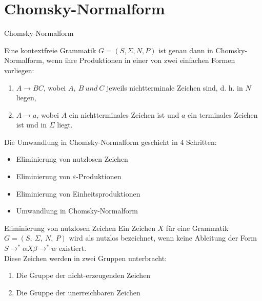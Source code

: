 \documentclass{beamer}
\begin{document}
	\section{Chomsky-Normalform}
		\begin{frame}{Chomsky-Normalform}
			\begin{definition}
				Eine kontextfreie Grammatik $G = (S, \Sigma, N, P)$ ist genau dann in Chomsky-Normalform, wenn ihre Produktionen in einer von zwei einfachen Formen vorliegen:
				\begin{enumerate}
					\item $A \to BC$, wobei $A,\ B \ und \ C$ jeweils nichtterminale Zeichen sind, d. h. in $N$ liegen,
					\item $A \to a$, wobei $A$ ein nichtterminales Zeichen ist und $a$ ein terminales Zeichen ist und in $\Sigma$ liegt. 
				\end{enumerate}
			\end{definition}
			\pause
			Die Umwandlung in Chomsky-Normalform geschieht in 4 Schritten:
			\pause
			\begin{itemize}
				\item Eliminierung von nutzlosen Zeichen
				\pause
				\item Eliminierung von $\varepsilon$-Produktionen
				\pause
				\item Eliminierung von Einheitsproduktionen
				\pause
				\item Umwandlung in Chomsky-Normalform
			\end{itemize}
		\end{frame}
		\begin{frame}{Eliminierung von nutzlosen Zeichen}
			Ein Zeichen $X$ für eine Grammatik $G = (S, \ \Sigma, \ N, \ P)$ wird als nutzlos bezeichnet, wenn keine Ableitung der Form $S \to^{*} \alpha X \beta \to^{*} w$ existiert.\\
			\pause
			Diese Zeichen werden in zwei Gruppen unterbracht:\\
			\pause
			\begin{enumerate}
				\item Die Gruppe der nicht-erzeugenden Zeichen
				\pause
				\item Die Gruppe der unerreichbaren Zeichen
			\end{enumerate} 
		\end{frame}
\end{document}
